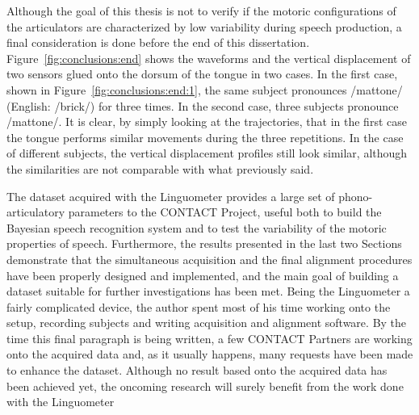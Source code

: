 
Although the goal of this thesis is not to verify if the motoric configurations
of the articulators are characterized by low variability during speech 
production, a final consideration is done before the end of this dissertation.
Figure~\ref{fig:conclusions:end} shows the waveforms and the vertical
displacement of two sensors glued onto the dorsum of the tongue in two cases.
In the first case, shown in Figure~\ref{fig:conclusions:end:1}, the same subject
pronounces /mattone/ (English: /brick/) for three times.
In the second case, three subjects pronounce /mattone/.
It is clear, by simply looking at the trajectories, that in the first case the
tongue performs similar movements during the three repetitions.
In the case of different subjects, the vertical displacement profiles still look
similar, although the similarities are not comparable with what previously 
said.

The dataset acquired with the Linguometer provides a large set of
phono-articulatory parameters to the CONTACT Project, useful both to build the
Bayesian speech recognition system and to test the variability of the motoric
properties of speech.
Furthermore, the results presented in the last two Sections demonstrate that
the simultaneous acquisition and the final alignment procedures have been
properly designed and implemented, and the main goal of building a dataset 
suitable for further investigations has been met.
Being the Linguometer a fairly complicated device, the author spent most of his
time working onto the setup, recording subjects and writing acquisition and
alignment software.
By the time this final paragraph is being written, 
a few CONTACT Partners are working onto the acquired data and, as it usually 
happens, many requests have been made to enhance the dataset.
Although no result based onto the acquired data has been achieved yet,
the oncoming research will surely benefit from the work done with the
Linguometer
